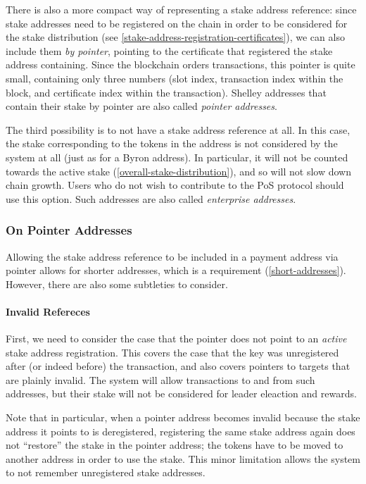 \documentclass[11pt,a4paper,dvipsnames,twosided]{article}
\begin{document}
There is also a more compact way of representing a stake address reference: since stake
addresses need to be registered on the chain in order to be considered for the
stake distribution (see \cref{stake-address-registration-certificates}), we can
also include them \emph{by pointer}, pointing to the certificate that
registered the stake address containing. Since the
blockchain orders transactions, this pointer is quite small, containing only
three numbers (slot index, transaction index within the block, and certificate
index within the transaction). Shelley addresses that contain their stake
 by pointer are also called \emph{pointer addresses}.

The third possibility is to not have a stake address reference at all. In this case,
the stake corresponding to the tokens in the address is not considered by the
system at all (just as for a Byron address). In particular, it will not be
counted towards the active stake (\cref{overall-stake-distribution}), and so
will not slow down chain growth. Users who do not wish to contribute to the PoS
protocol should use this option. Such addresses are also called \emph{enterprise
  addresses}.

\subsubsection{On Pointer Addresses}
\label{pointer-address}

Allowing the stake address reference to be included in a payment address via pointer
allows for shorter addresses, which is a requirement (\cref{short-addresses}).
However, there are also some subtleties to consider.

\paragraph{Invalid Refereces}
First, we need to consider the case that the pointer does not point to an
\emph{active} stake address registration. This covers the case that the key was
unregistered after (or indeed before) the transaction, and also covers pointers
to targets that are plainly invalid. The system will allow transactions to and
from such addresses, but their stake will not be considered for leader eleaction
and rewards.

Note that in particular, when a pointer address becomes invalid because the
stake address it points to is deregistered, registering the same stake address
again does not ``restore'' the stake in the pointer address; the tokens have to
be moved to another address in order to use the stake. This minor limitation
allows the system to not remember unregistered stake addresses.
\end{document}
